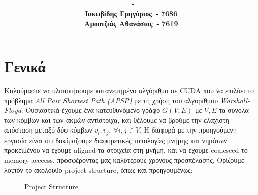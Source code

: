 \documentclass[11pt,a4paper,titlepage]{article}
\title{
	\vspace{5cm}
	\huge{\textbf{\hmwkClass}}\\
	\vspace{9pt}
	\LARGE{\hmwkTitle}\\
	\vspace{7cm}
}
\author{\textbf{\hmwkAuthorName\ - \hmwkAuthorAEM}
		\vspace{0.5em}\\
		\textbf{Ιακωβίδης Γρηγόριος\ - 7686}
		\vspace{0.5em}\\
		\textbf{Αμουτζιάς Αθανάσιος\ - 7619}}
\date{} %
\begin{document}
	\maketitle





	\section{Γενικά}
	Καλούμαστε να υλοποιήσουμε κατανεμημένο αλγόριθμο σε CUDA που να επιλύει το πρόβλημα \textit{All Pair Shortest Path (APSP)} με τη χρήση του αλγορίθμου \textit{Warshall-Floyd}. Ουσιαστικά έχουμε ένα κατευθυνόμενο γράφο $G(V, E)$ με $V, E$ τα σύνολα των κόμβων και των ακμών αντίστοιχα, και θέλουμε να βρούμε την ελάχιστη απόσταση μεταξύ δύο κόμβων $v_i, v_j,\ \forall i,j \in V$. Η διαφορά με την προηγούμενη εργασία είναι ότι δοκίμαζουμε διαφορετικές τοπολογίες μνήμης και νημάτων προκειμένου να έχουμε aligned τα στοιχεία στη μνήμη, και να έχουμε coalesced το memory acceess, προσφέροντας μας καλύτερους χρόνους προσπέλασης. Ορίζουμε λοιπόν το ακόλουθο project structure, όπως και προηγουμένως:\\

	\begin{wrapfigure}{r}{0.4\textwidth}
		\begin{minipage}[t]{0.4\textwidth}
		\end{minipage}
		\caption{Project Structure}
	\end{wrapfigure}
\end{document}

